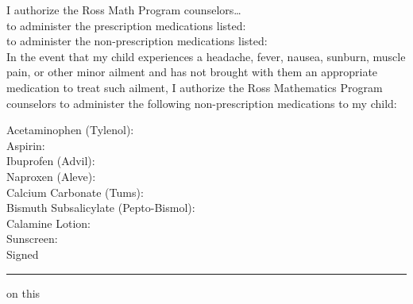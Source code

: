 \documentclass{ross}
\begin{document}
I authorize the Ross Math Program counselors\ldots\\
to administer the \phantom{non-}prescription medications listed:   \\
to administer the non-prescription medications listed:   \\

In the event that my child experiences a headache, fever, nausea,
sunburn, muscle pain, or other minor ailment and has not brought with
them an appropriate medication to treat such ailment, I authorize the
Ross Mathematics Program counselors to administer the following
non-prescription medications to my child:

  Acetaminophen (Tylenol):   \\
  Aspirin:   \\
Ibuprofen (Advil):    \\ Naproxen (Aleve):    \\
Calcium Carbonate (Tums):   \\
Bismuth Subsalicylate (Pepto-Bismol):    \\
Calamine Lotion:   \\ Sunscreen:    \\

\vspace{0.25in}
Signed \rule{3in}{.1mm}  on this  \\[-5pt]
\hspace*{1in}{\footnotesize \textcolor{gray}{Parent or legal guardian} }

\end{document}
